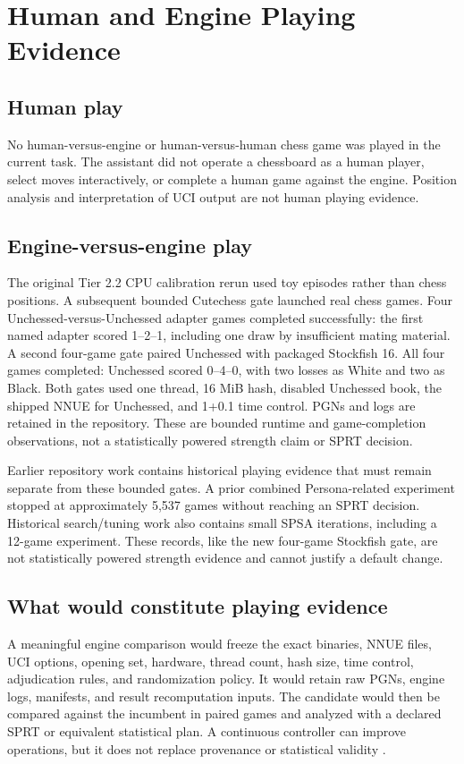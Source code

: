 \documentclass[conference]{IEEEtran}
\begin{document}
\section{Human and Engine Playing Evidence}
\subsection{Human play}
No human-versus-engine or human-versus-human chess game was played in the current task. The assistant did not operate a chessboard as a human player, select moves interactively, or complete a human game against the engine. Position analysis and interpretation of UCI output are not human playing evidence.

\subsection{Engine-versus-engine play}
The original Tier 2.2 CPU calibration rerun used toy episodes rather than chess positions. A subsequent bounded Cutechess gate launched real chess games. Four Unchessed-versus-Unchessed adapter games completed successfully: the first named adapter scored 1--2--1, including one draw by insufficient mating material. A second four-game gate paired Unchessed with packaged Stockfish 16. All four games completed: Unchessed scored 0--4--0, with two losses as White and two as Black. Both gates used one thread, 16 MiB hash, disabled Unchessed book, the shipped NNUE for Unchessed, and 1+0.1 time control. PGNs and logs are retained in the repository. These are bounded runtime and game-completion observations, not a statistically powered strength claim or SPRT decision.

Earlier repository work contains historical playing evidence that must remain separate from these bounded gates. A prior combined Persona-related experiment stopped at approximately 5,537 games without reaching an SPRT decision. Historical search/tuning work also contains small SPSA iterations, including a 12-game experiment. These records, like the new four-game Stockfish gate, are not statistically powered strength evidence and cannot justify a default change.

\subsection{What would constitute playing evidence}
A meaningful engine comparison would freeze the exact binaries, NNUE files, UCI options, opening set, hardware, thread count, hash size, time control, adjudication rules, and randomization policy. It would retain raw PGNs, engine logs, manifests, and result recomputation inputs. The candidate would then be compared against the incumbent in paired games and analyzed with a declared SPRT or equivalent statistical plan. A continuous controller can improve operations, but it does not replace provenance or statistical validity \cite{stockfishfishtest,fastchess}.
\end{document}
